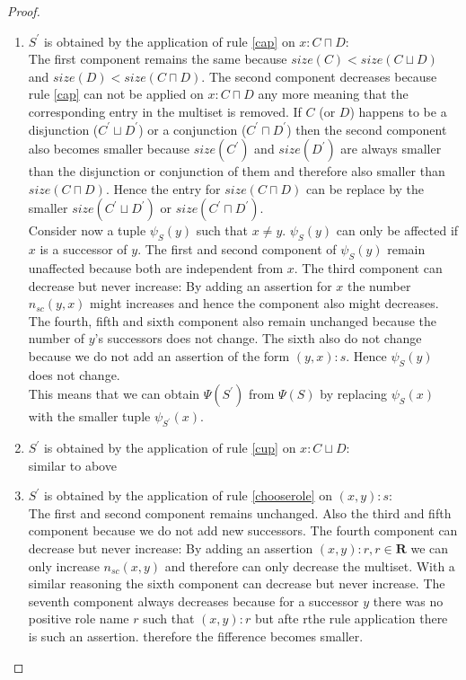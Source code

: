 \documentclass[a4paper,11pt]{scrartcl}
\theoremstyle{break}
\theoremstyle{definition}
\begin{document}
\begin{proof}$ $\\
\vspace*{-5mm}
\begin{enumerate}
\item $S^\prime$ is obtained by the application of rule \ref{cap} on $x:C\sqcap D$:\\
The first component remains the same because $size(C)<size(C\sqcup D)$ and $size(D)<size(C\sqcap D)$. The second component decreases because rule \ref{cap} can not be applied on $x:C\sqcap D$ any more meaning that the corresponding entry in the multiset is removed. If $C$ (or $D$) happens to be a disjunction ($C^\prime\sqcup D^\prime$) or a conjunction ($C^\prime\sqcap D^\prime$) then the second component also becomes smaller because $size(C^\prime)$ and $size(D^\prime)$ are always smaller than the disjunction or conjunction of them and therefore also smaller than $size(C\sqcap D)$. Hence the entry for $size(C\sqcap D)$ can be replace by the smaller $size(C^\prime\sqcup D^\prime)$ or $size(C^\prime\sqcap D^\prime)$.\\
Consider now a tuple $\psi_S(y)$ such that $x\neq y$. $\psi_S(y)$ can only be affected if $x$ is a successor of $y$. The first and second component of $\psi_S(y)$ remain unaffected because both are independent from $x$. The third component can decrease but never increase: By adding an assertion for $x$ the number $n_{sc}(y,x)$ might increases and hence the component also might decreases. The fourth, fifth and sixth component also remain unchanged because the number of $y$'s successors does not change. The sixth also do not change because we do not add an assertion of the form $(y,x):s$. Hence $\psi_S(y)$ does not change.\\
This means that we can obtain $\Psi(S^\prime)$ from $\Psi(S)$ by replacing $\psi_S(x)$ with the smaller tuple $\psi_{S^\prime}(x)$. 
\item $S^\prime$ is obtained by the application of rule \ref{cup} on $x:C\sqcup D$:\\
similar to above
\item $S^\prime$ is obtained by the application of rule \ref{chooserole} on $(x,y):s$:\\
The first and second component remains unchanged. Also the third and fifth component because we do not add new successors. The fourth component can decrease but never increase: By adding an assertion $(x,y):r, r\in\mathbf{R}$ we can only increase $n_{sc}(x,y)$ and therefore can only decrease the multiset. With a similar reasoning the sixth component can decrease but never increase. The seventh component always decreases because for a successor $y$ there was no positive role name $r$ such that $(x,y):r$ but afte rthe rule application there is such an assertion. therefore the fifference becomes smaller.\\

\end{enumerate}
\end{proof}
\end{document}
